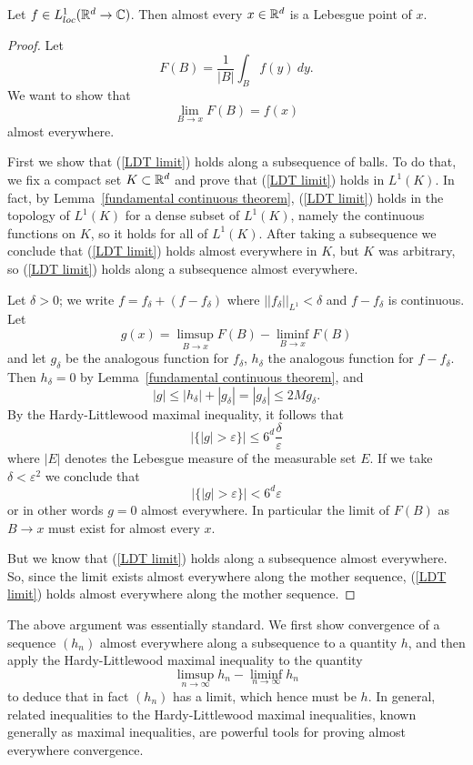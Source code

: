 \begin{theorem}
Let $f \in L^1_{loc}(\mathbb{R}^d \to \mathbb{C})$. Then almost every $x \in \mathbb{R}^d$ is a Lebesgue point of $x$.
\end{theorem}
\begin{proof}
Let
$$F(B) = \frac{1}{|B|} \int_B f(y) ~dy.$$
We want to show that
\begin{equation}\label{LDT limit}
\lim_{B \to x} F(B) = f(x)
\end{equation}
almost everywhere.

First we show that (\ref{LDT limit}) holds along a subsequence of balls.
To do that, we fix a compact set $K \subset \mathbb{R}^d$ and prove that (\ref{LDT limit}) holds in $L^1(K)$.
In fact, by Lemma~\ref{fundamental continuous theorem}, (\ref{LDT limit}) holds in the topology of $L^1(K)$ for a dense subset of $L^1(K)$, namely the continuous functions on $K$, so it holds for all of $L^1(K)$.
After taking a subsequence we conclude that (\ref{LDT limit}) holds almost everywhere in $K$, but $K$ was arbitrary, so (\ref{LDT limit}) holds along a subsequence almost everywhere.

Let $\delta > 0$; we write $f = f_\delta + (f - f_\delta)$ where $||f_\delta||_{L^1} < \delta$ and $f - f_\delta$ is continuous.
Let
$$g(x) = \limsup_{B \to x} F(B) - \liminf_{B \to x} F(B)$$
and let $g_\delta$ be the analogous function for $f_\delta$, $h_\delta$ the analogous function for $f - f_\delta$.
Then $h_\delta = 0$ by Lemma~\ref{fundamental continuous theorem}, and
$$|g| \leq |h_\delta| + |g_\delta| = |g_\delta| \leq 2Mg_\delta.$$
By the Hardy-Littlewood maximal inequality, it follows that
$$|\{|g| > \varepsilon\}| \leq 6^d\frac{\delta}{\varepsilon}$$
where $|E|$ denotes the Lebesgue measure of the measurable set $E$.
If we take $\delta < \varepsilon^2$ we conclude that
$$|\{|g| > \varepsilon\}| < 6^d\varepsilon$$
or in other words $g = 0$ almost everywhere. In particular the limit of $F(B)$ as $B \to x$ must exist for almost every $x$.

But we know that (\ref{LDT limit}) holds along a subsequence almost everywhere.
So, since the limit exists almost everywhere along the mother sequence, (\ref{LDT limit}) holds almost everywhere along the mother sequence.
\end{proof}

\begin{subsec}
The above argument was essentially standard.
We first show convergence of a sequence $(h_n)$ almost everywhere along a subsequence to a quantity $h$, and then apply the Hardy-Littlewood maximal inequality to the quantity
$$\limsup_{n \to \infty} h_n - \liminf_{n \to \infty} h_n$$
to deduce that in fact $(h_n)$ has a limit, which hence must be $h$.
In general, related inequalities to the Hardy-Littlewood maximal inequalities, known generally as maximal inequalities, are powerful tools for proving almost everywhere convergence.
\end{subsec}

